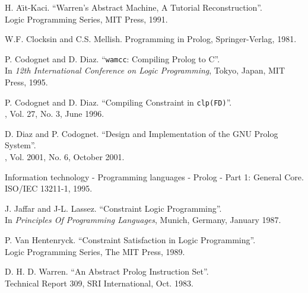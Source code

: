 \newpage


\begin{thebibliography}{99}

 H. A\"{\i}t-Kaci.
\newblock ``Warren's Abstract Machine, A Tutorial Reconstruction''. \\
\newblock Logic Programming Series, MIT Press, 1991. \\
\newblock {}

 W.F. Clocksin and C.S. Mellish.
\newblock Programming in Prolog, Springer-Verlag, 1981.

 P. Codognet and D. Diaz.
\newblock ``{\tt wamcc}: Compiling Prolog to C''.\\
\newblock In {\em 12th International Conference on Logic Programming},
Tokyo, Japan, MIT Press, 1995. \\
\newblock {}


 P. Codognet and D. Diaz.
\newblock ``Compiling Constraint in {\tt clp(FD)}''. \\
, Vol. 27, No. 3, June 1996. \\
\newblock {}

 D. Diaz and P. Codognet. 
\newblock ``Design and Implementation of the GNU Prolog System''. \\
, Vol. 2001, No. 6, October 2001. \\
\newblock {}

\newblock Information technology - Programming languages - Prolog - Part 1:
General Core. \\
\newblock ISO/IEC 13211-1, 1995.

 J. Jaffar and J-L. Lassez.
\newblock ``Constraint Logic Programming''. \\
\newblock In {\em Principles Of Programming Languages},
Munich, Germany, January 1987. 

 P. Van Hentenryck.
\newblock ``Constraint Satisfaction in Logic Programming''. \\
\newblock Logic Programming Series, The MIT Press, 1989.

 D. H. D. Warren.
\newblock ``An Abstract Prolog Instruction Set''. \\
\newblock Technical Report 309, SRI International, Oct. 1983.

\end{thebibliography}
